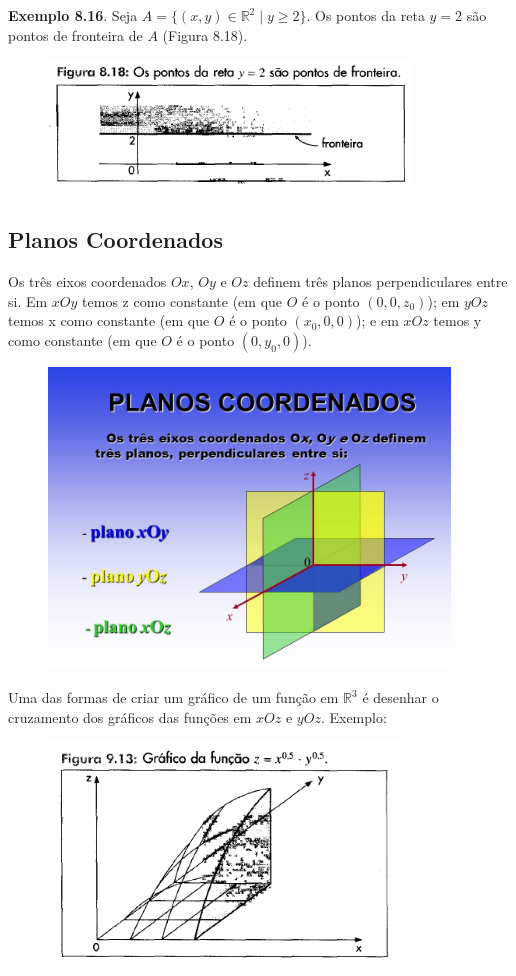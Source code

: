 		\textbf{Exemplo 8.16}. Seja $A = \{(x, y) \in \mathbb{R}^2 \mid y \geq 2\}$. Os pontos da reta $y = 2$ são pontos de fronteira de $A$ (Figura 8.18).

		\begin{figure}[H]
			\includegraphics[height=3.5cm]{images/morettin_figura-8-18}
		\end{figure}
		
	\subsection{Planos Coordenados \cite{google}}

		Os três eixos coordenados $Ox$, $Oy$ e $Oz$ definem três planos perpendiculares entre si. Em $xOy$ temos z como constante (em que $O$ é o ponto $(0, 0, z_{0})$); em $yOz$ temos x como constante (em que $O$ é o ponto $(x_{0}, 0, 0)$); e em $xOz$ temos y como constante (em que $O$ é o ponto $(0, y_{0}, 0)$).

		\begin{figure}[H]
			\includegraphics[height=8cm]{images/google-images_planos-coordenados}
		\end{figure}
		
		Uma das formas de criar um gráfico de um função em $\mathbb{R}^{3}$ é desenhar o cruzamento dos gráficos das funções em $xOz$ e $yOz$. Exemplo:
		
		\begin{figure}[H]
			\includegraphics[height=6cm]{images/morettin_figura-9-13}
		\end{figure}